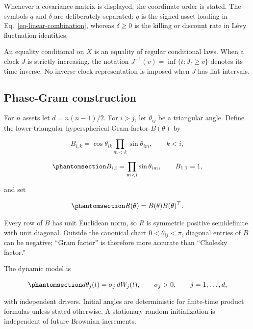 \documentclass[
  english,
  11pt,
  letterpaper,
  DIV=11,
  numbers=noendperiod]{scrartcl}
\theoremstyle{plain}
\theoremstyle{plain}
\theoremstyle{plain}
\theoremstyle{plain}
\theoremstyle{remark}
\begin{document}
Whenever a covariance matrix is displayed, the coordinate order is
stated. The symbols \(q\) and \(\delta\) are deliberately separated:
\(q\) is the signed asset loading in Eq.~\ref{eq-linear-combination},
whereas \(\delta\ge0\) is the killing or discount rate in Lévy
fluctuation identities.

An equality conditional on \(X\) is an equality of regular conditional
laws. When a clock \(J\) is strictly increasing, the notation
\(J^{-1}(v)=\inf\{t:J_t\ge v\}\) denotes its time inverse. No
inverse-clock representation is imposed when \(J\) has flat intervals.

\subsection{Phase-Gram construction}\label{phase-gram-construction}

For \(n\) assets let \(d=n(n-1)/2\). For \(i>j\), let \(\theta_{ij}\) be
a triangular angle. Define the lower-triangular hyperspherical Gram
factor \(B(\theta)\) by

\[
B_{i,k}
=\cos\theta_{ik}\prod_{m<k}\sin\theta_{im},
\qquad k<i,
\]

\begin{equation}\protect\phantomsection\label{eq-gram-factor}{
B_{i,i}=\prod_{m<i}\sin\theta_{im},
\qquad B_{1,1}=1,
}\end{equation}

and set

\begin{equation}\protect\phantomsection\label{eq-gram-map}{
R(\theta)=B(\theta)B(\theta)^\top.
}\end{equation}

Every row of \(B\) has unit Euclidean norm, so \(R\) is symmetric
positive semidefinite with unit diagonal. Outside the canonical chart
\(0<\theta_{ij}<\pi\), diagonal entries of \(B\) can be negative; ``Gram
factor'' is therefore more accurate than ``Cholesky factor.''

The dynamic model is

\begin{equation}\protect\phantomsection\label{eq-angle-bm}{
d\theta_j(t)=\sigma_j\,dW_j(t),
\qquad \sigma_j>0,
\qquad j=1,\ldots,d,
}\end{equation}

with independent drivers. Initial angles are deterministic for
finite-time product formulas unless stated otherwise. A stationary
random initialization is independent of future Brownian increments.
\end{document}
